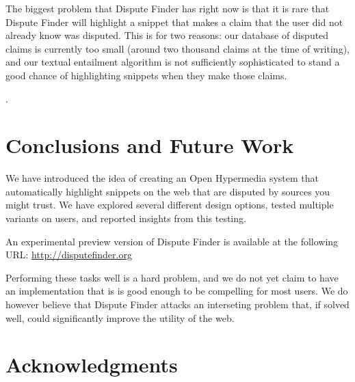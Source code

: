 \documentclass{www2010-submission}
\newcommand{\todo}[1]{}
\begin{document}
The biggest problem that Dispute Finder has right now is that it is rare that Dispute Finder will highlight a snippet that makes a claim that the user did not already know was disputed. This is for two reasons: our database of disputed claims is currently too small (around two thousand claims at the time of writing), and our textual entailment algorithm is not sufficiently sophisticated to stand a good chance of highlighting snippets when they make those claims.

\todo{Need to say that the argumentation graph contains all existing claims and that it was a simple "supports"/"oppsose" graph.}.

\todo{Come up with terminology for marking an evidence snippet, and agree on evidence vs source vs article}
\todo{Talk about how the early versions conflated evidence and snippets - and whether it makes sense to distinguish between them}
\todo{Screenshot of the claim graph interface}


\section{Conclusions and Future Work}

We have introduced the idea of creating an Open Hypermedia system that automatically highlight snippets on the web that are disputed by sources you might trust. We have explored several different design options, tested multiple variants on users, and reported insights from this testing.

An experimental preview version of Dispute Finder is available at the following URL:
\url{http://disputefinder.org}

Performing these tasks well is a hard problem, and we do not yet claim to have an implementation that is is good enough to be compelling for most users. We do however believe that Dispute Finder attacks an interseting problem that, if solved well, could significantly improve the utility of the web.


\section{Acknowledgments}

\todo{Do we want to have acknowledgements}


\todo{Sort out bad references}

\end{document}
